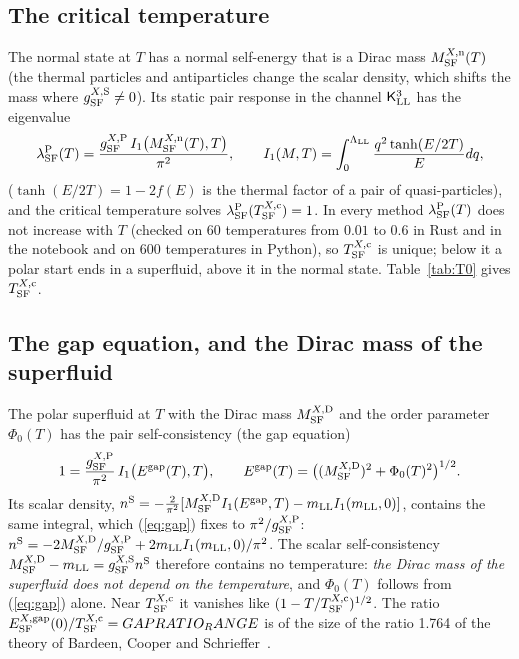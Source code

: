 \documentclass[aps,prd,onecolumn,superscriptaddress,nofootinbib,floatfix,longbibliography]{revtex4-2}
\newcommand{\LL}{{\rm LL}}
\newcommand{\SF}{{\rm SF}}
\begin{document}
\subsection{The critical temperature}

The normal state at $T$ has a normal self-energy that is a Dirac mass $M^{X,{\rm n}}_\SF(T)$ (the thermal particles and
antiparticles change the scalar density, which shifts the mass where $g^{X,{\rm S}}_\SF\ne0$). Its static pair response in the
channel $\mathsf K^3_\LL$ has the eigenvalue
\begin{equation}
\lambda^{\rm P}_\SF(T)=\frac{g^{X,{\rm P}}_\SF\,I_1\big(M^{X,{\rm n}}_\SF(T),T\big)}{\pi^2},\qquad I_1(M,T)=\int_0^{\Lambda_\LL}\frac{q^2\tanh(E/2T)}{E}dq,
\label{eq:lambdaT}
\end{equation}
($\tanh(E/2T)=1-2f(E)$ is the thermal factor of a pair of quasi-particles), and the critical temperature solves
$\lambda^{\rm P}_\SF(T^{X,{\rm c}}_\SF)=1$. In every method $\lambda^{\rm P}_\SF(T)$ does not increase with $T$ (checked on 60 temperatures from $0.01$
to $0.6$ in Rust and in the notebook and on 600 temperatures in Python), so $T^{X,{\rm c}}_\SF$ is unique; below it a polar start
ends in a superfluid, above it in the normal state. Table~\ref{tab:T0} gives $T^{X,{\rm c}}_\SF$.

\subsection{The gap equation, and the Dirac mass of the superfluid}

The polar superfluid at $T$ with the Dirac mass $M^{X,{\rm D}}_\SF$ and the order parameter $\Phi_0(T)$ has the pair self-consistency
(the gap equation)
\begin{equation}
1=\frac{g^{X,{\rm P}}_\SF}{\pi^2}\,I_1\big(E^{\rm gap}(T),T\big),\qquad E^{\rm gap}(T)=\big((M^{X,{\rm D}}_\SF)^2+\Phi_0(T)^2\big)^{1/2}.
\label{eq:gap}
\end{equation}
Its scalar density,
$n^{\rm S}=-\frac2{\pi^2}[M^{X,{\rm D}}_\SF I_1(E^{\rm gap},T)-m_\LL I_1(m_\LL,0)]$, contains the same integral, which (\ref{eq:gap}) fixes to
$\pi^2/g^{X,{\rm P}}_\SF$: $n^{\rm S}=-2M^{X,{\rm D}}_\SF/g^{X,{\rm P}}_\SF+2m_\LL I_1(m_\LL,0)/\pi^2$. The scalar self-consistency
$M^{X,{\rm D}}_\SF-m_\LL=g^{X,{\rm S}}_\SF n^{\rm S}$ therefore contains no temperature: \emph{the Dirac mass of the superfluid does not
depend on the temperature}, and $\Phi_0(T)$ follows from (\ref{eq:gap}) alone. Near $T^{X,{\rm c}}_\SF$ it vanishes like
$(1-T/T^{X,{\rm c}}_\SF)^{1/2}$. The ratio $E^{X,{\rm gap}}_\SF(0)/T^{X,{\rm c}}_\SF={{GAPRATIO_RANGE}}$ is of the size of the ratio 1.764 of the
theory of Bardeen, Cooper and Schrieffer~\cite{BCS1957}.
\end{document}
